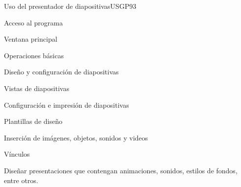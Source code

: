 \begin{syllabus}
\begin{unit}{Uso del presentador de diapositivas}{USGP}{9}{3}
\begin{topics}
      \item Acceso al programa
      \item Ventana principal
      \item Operaciones básicas
      \item Diseño y configuración de diapositivas
      \item Vistas de diapositivas
      \item Configuración e impresión de diapositivas
      \item Plantillas de diseño 
      \item Inserción de imágenes, objetos, sonidos y videos
      \item Vínculos
\end{topics}
\begin{learningoutcomes}
   \item Diseñar presentaciones que contengan animaciones, sonidos, estilos de fondos, entre otros.
\end{learningoutcomes}
\end{unit}

\begin{coursebibliography}

\end{coursebibliography}

\end{syllabus}
